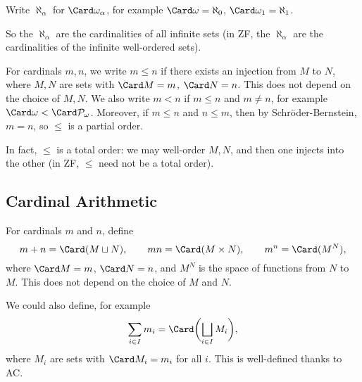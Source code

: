 \documentclass[12pt]{article}
\begin{document}
Write $\aleph_\alpha$ for $\Card \omega_\alpha$, for example $\Card \omega = \aleph_0$, $\Card \omega_1 = \aleph_1$.

So the $\aleph_\alpha$ are the cardinalities of all infinite sets (in ZF, the $\aleph_\alpha$ are the cardinalities of the infinite well-ordered sets).

For cardinals $m, n$, we write $m \le n$ if there exists an injection from $M$ to $N$, where $M, N$ are sets with $\Card M = m$, $\Card N = n$. This does not depend on the choice of $M, N$. We also write $m < n$ if $m \leq n$ and $m \neq n$, for example $\Card \omega < \Card \mathcal{P}_\omega$. Moreover, if $m \le n$ and $n \le m$, then by Schr\"{o}der-Bernstein, $m = n$, so $\le$ is a partial order.

In fact, $\le$ is a total order: we may well-order $M, N$, and then one injects into the other (in ZF, $\le$ need not be a total order).

\subsection{Cardinal Arithmetic}
\label{sub:cardinal_arithmetic}

For cardinals $m$ and $n$, define
\[
m+n = \Card(M \sqcup N), \qquad mn = \Card(M \times N), \qquad m^{n} = \Card(M^{N}),
\]
where $\Card M = m$, $\Card N = n$, and $M^{N}$ is the space of functions from $N$ to $M$. This does not depend on the choice of $M$ and $N$.

We could also define, for example
\[
	\sum_{i \in I}m_i = \Card \biggl( \bigsqcup_{i \in I} M_i \biggr),
\]
where $M_i$ are sets with $\Card M_i = m_i$ for all $i$. This is well-defined thanks to AC.
\end{document}
